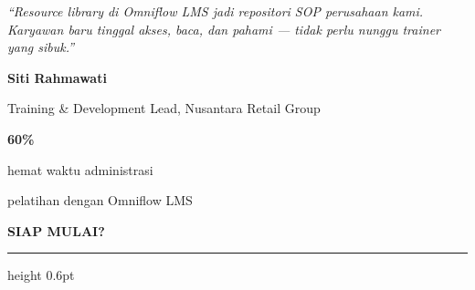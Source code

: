 \documentclass[a4paper]{article}
\newcommand{\sectiontitle}[1]{%
    \vspace{10pt}%
    {\fontsize{13}{16}\selectfont\bfseries\color{BlueDark} #1}\par\vspace{3pt}%
    {\color{BluePrimary}\hrule height 0.6pt}\par\vspace{8pt}%
}
\begin{document}
\noindent
\begin{minipage}[t]{0.485\textwidth}
    \colorbox{BlueBg}{%
        \begin{minipage}{\dimexpr\linewidth-2\fboxsep\relax}
            {\fontsize{9.5}{13}\selectfont\color{TextDark}\textit{``Resource library di Omniflow LMS jadi repositori SOP perusahaan kami. Karyawan baru tinggal akses, baca, dan pahami --- tidak perlu nunggu trainer yang sibuk.''}}\par\vspace{4pt}
            {\fontsize{8.5}{11}\selectfont\bfseries\color{BluePrimary} Siti Rahmawati}\par
            {\fontsize{8}{10}\selectfont\color{TextLight} Training \& Development Lead, Nusantara Retail Group}
        \end{minipage}}
\end{minipage}%
\hfill
\begin{minipage}[t]{0.485\textwidth}
    \colorbox{BlueBg}{%
        \begin{minipage}{\dimexpr\linewidth-2\fboxsep\relax}
            \begin{center}
                {\fontsize{20}{24}\selectfont\bfseries\color{VioletPrimary} 60\%}\par
                {\fontsize{9.5}{12}\selectfont\color{TextDark} hemat waktu administrasi}\par
                {\fontsize{9.5}{12}\selectfont\color{TextDark} pelatihan dengan Omniflow LMS}
            \end{center}
        \end{minipage}}
\end{minipage}

\sectiontitle{SIAP MULAI?}
\end{document}

